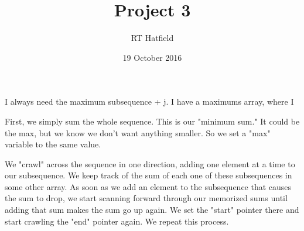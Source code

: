 \documentclass{article}
\title{Project 3}
\author{RT Hatfield}
\date{19 October 2016}
\begin{document}
\maketitle

I always need the maximum subsequence + j.
I have a maximums array, where I 

First, we simply sum the whole sequence.  This is our "minimum sum."  It could be the max, but we know we don't
want anything smaller.  So we set a "max" variable to the same value.





We "crawl" across the sequence in one direction, adding one element at a time to our subsequence.  We keep track of
the sum of each one of these subsequences in some other array.  As soon as we add an element to the subsequence that
causes the sum to drop, we start scanning forward through our memorized sums until adding that sum makes the sum go 
up again.  We set the "start" pointer there and start crawling the "end" pointer again.  We repeat this process.
\end{document}
